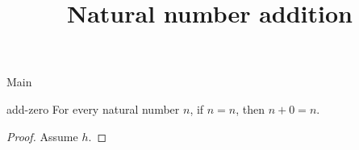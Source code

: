 \begin{lexlean}{Main}
\title{Natural number addition}

\begin{theorem}{add-zero}
\noaxioms
For every natural number \(n\), if \(n = n\), then \(n + 0 = n\).
\begin{proof}
Assume \(h\).
\end{proof}
\end{theorem}
\end{lexlean}
